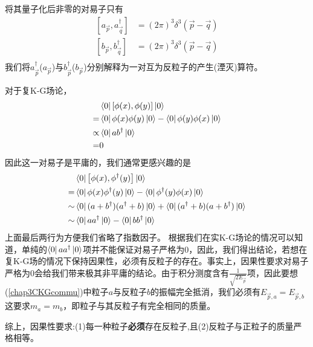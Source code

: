 将其量子化后非零的对易子只有
\begin{equation}
    \begin{aligned}
        \left[a_{\vec{p}},a^{\dagger}_{\vec{q}}\right]&=(2\pi)^{3}\delta^{3}(\vec{p}-\vec{q})\\
            \left[b_{\vec{p}},b^{\dagger}_{\vec{q}}\right]&=(2\pi)^{3}\delta^{3}(\vec{p}-\vec{q})\\
    \end{aligned}
\end{equation}
我们将$a^{\dagger}_{\vec{p}}$($a_{\vec{p}}$)与$b^{\dagger}_{\vec{p}}$($b_{\vec{p}}$)分别解释为一对互为反粒子的产生(湮灭)算符。

对于复K-G场论，
\begin{equation}
    \begin{aligned}
         &\bra{0}\left[\phi(x),\phi(y)\right]\ket{0}\\
    =&\bra{0}\phi(x)\phi(y)\ket{0}-\bra{0}\phi(y)\phi(x)\ket{0}\\
    \propto&\bra{0}ab^{\dagger}\ket{0}\\
    =&0
    \end{aligned}
\end{equation}
因此这一对易子是平庸的，我们通常更感兴趣的是
\begin{equation}
\label{chap3CKGcommu}
    \begin{aligned}
         &\bra{0}\left[\phi(x),\phi^{\dagger}(y)\right]\ket{0}\\
    =&\bra{0}\phi(x)\phi^{\dagger}(y)\ket{0}-\bra{0}\phi^{\dagger}(y)\phi(x)\ket{0}\\
    \sim &\bra{0}(a+b^{\dagger})(a^{\dagger}+b)\ket{0}+\bra{0}(a^{\dagger}+b)(a+b^{\dagger})\ket{0}\\
    \sim &\bra{0}aa^{\dagger}\ket{0}-\bra{0}bb^{\dagger}\ket{0}
    \end{aligned}
\end{equation}
上面最后两行为方便我们省略了指数因子。
根据我们在实K-G场论的情况可以知道，单纯的$\bra{0}aa^{\dagger}\ket{0}$项并不能保证对易子严格为0，因此，我们得出结论，若想在复K-G场的情况下保持因果性，必须有反粒子的存在。事实上，因果性要求对易子严格为0会给我们带来极其非平庸的结论。由于积分测度含有$\frac{1}{\sqrt{2E_{\vec{p}}}}$项，因此要想(\ref{chap3CKGcommu})中粒子$a$与反粒子$b$的振幅完全抵消，我们必须有$E_{\vec{p},a}=E_{\vec{p},b}$这要求$m_{a}=m_{b}$，即粒子与其反粒子有完全相同的质量。

综上，因果性要求:(1)每一种粒子\textbf{必须}存在反粒子,且(2)反粒子与正粒子的质量严格相等。

